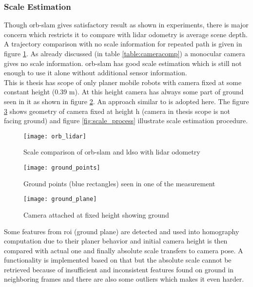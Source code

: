 \subsubsection{Scale Estimation}
Though \acrshort{orb}-\acrshort{slam} gives satisfactory result as shown in experiments, there is major concern which restricts it to compare with \acrshort{lidar} odometry is average scene depth. A trajectory comparison with no scale information for repeated path is given in figure \ref{fig:orb_lidar}. As already discussed (in table \ref{table:cameracomp}) a monocular camera gives no scale information. \acrshort{orb}-\acrshort{slam} has good scale estimation which is still not enough to use it alone without additional sensor information.\\
\newline This is thesis has scope of only planer mobile robots with camera fixed at some constant height (0.39 m). At this height camera has always some part of ground seen in it as shown in figure \ref{fig:ground_points}. An approach similar to \cite{ground} is adopted here. The figure \ref{fig:ground_plane} shows geometry of camera fixed at height h (camera in thesis scope is not facing ground) and figure \ref{fig:scale_process} illustrate scale estimation procedure.
\begin{figure}[H]
	\centering
	\texttt{[image: orb\_lidar]}
	\caption{Scale comparison of \acrshort{orb}-\acrshort{slam} and \acrshort{ldso} with \acrshort{lidar} odometry}
	\label{fig:orb_lidar}
\end{figure}
\begin{figure}[H]
	\centering
	\texttt{[image: ground\_points]}
	\caption{Ground points (blue rectangles) seen in one of the measurement}
	\label{fig:ground_points}
\end{figure}
\begin{figure}[H]
	\centering
	\texttt{[image: ground\_plane]}
	\caption{Camera attached at fixed height showing ground \cite{ground}}
	\label{fig:ground_plane}
\end{figure}
\noindent Some features from \acrshort{roi} (ground plane) are detected and used into homography computation due to their planer behavior and initial camera height is then compared with actual one and finally absolute scale transfers to camera pose. A functionality is implemented based on that but the absolute scale cannot be retrieved because of insufficient and inconsistent features found on ground in neighboring frames and there are also some outliers which makes it even harder.\\

